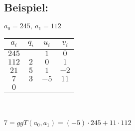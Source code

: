\subsection{Beispiel:} 
$a_{0} = 245, \ a_{1} = 112$ \\
\begin{center}
	\begin{tabular} {cccc}
		$a_{i}$ & $q_{i}$ & $u_{i}$ & $v_{i}$ \\ \hline
		$245$   & \qquad  &    $1$    &     $0$ \\ 
		$112$   &  $2$      &	    $0$    &     $1$ \\
		$21$     &  $5$      &    $1$    &     $-2$ \\
		$7$       &  $3$      &    $-5$   &     $11$ \\
		$0$       &              &              &               \\
	\end{tabular} 
\end{center}
\qquad\\
\\
$7 = ggT(a_{0},a_{1}) = (-5) \cdot 245 + 11 \cdot 112$